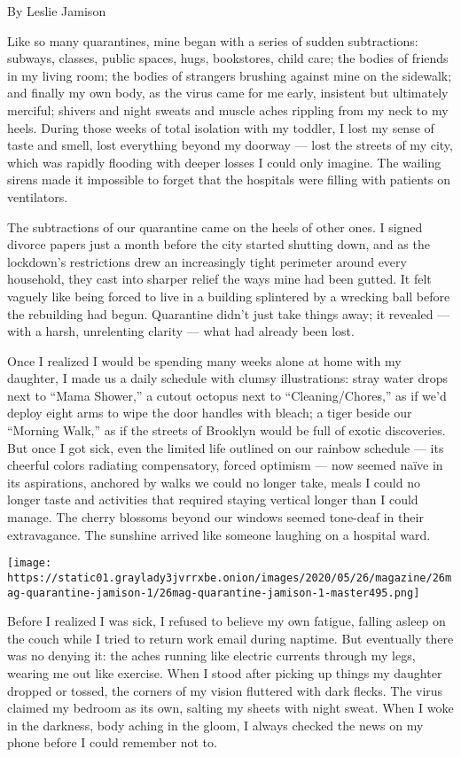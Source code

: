By Leslie Jamison

Like so many quarantines, mine began with a series of sudden
subtractions: subways, classes, public spaces, hugs, bookstores, child
care; the bodies of friends in my living room; the bodies of strangers
brushing against mine on the sidewalk; and finally my own body, as the
virus came for me early, insistent but ultimately merciful; shivers and
night sweats and muscle aches rippling from my neck to my heels. During
those weeks of total isolation with my toddler, I lost my sense of taste
and smell, lost everything beyond my doorway --- lost the streets of my
city, which was rapidly flooding with deeper losses I could only
imagine. The wailing sirens made it impossible to forget that the
hospitals were filling with patients on ventilators.

The subtractions of our quarantine came on the heels of other ones. I
signed divorce papers just a month before the city started shutting
down, and as the lockdown's restrictions drew an increasingly tight
perimeter around every household, they cast into sharper relief the ways
mine had been gutted. It felt vaguely like being forced to live in a
building splintered by a wrecking ball before the rebuilding had begun.
Quarantine didn't just take things away; it revealed --- with a harsh,
unrelenting clarity --- what had already been lost.

Once I realized I would be spending many weeks alone at home with my
daughter, I made us a daily schedule with clumsy illustrations: stray
water drops next to ``Mama Shower,'' a cutout octopus next to
``Cleaning/Chores,'' as if we'd deploy eight arms to wipe the door
handles with bleach; a tiger beside our ``Morning Walk,'' as if the
streets of Brooklyn would be full of exotic discoveries. But once I got
sick, even the limited life outlined on our rainbow schedule --- its
cheerful colors radiating compensatory, forced optimism --- now seemed
naïve in its aspirations, anchored by walks we could no longer take,
meals I could no longer taste and activities that required staying
vertical longer than I could manage. The cherry blossoms beyond our
windows seemed tone-deaf in their extravagance. The sunshine arrived
like someone laughing on a hospital ward.

\texttt{[image: https://static01.graylady3jvrrxbe.onion/images/2020/05/26/magazine/26mag-quarantine-jamison-1/26mag-quarantine-jamison-1-master495.png]}

Before I realized I was sick, I refused to believe my own fatigue,
falling asleep on the couch while I tried to return work email during
naptime. But eventually there was no denying it: the aches running like
electric currents through my legs, wearing me out like exercise. When I
stood after picking up things my daughter dropped or tossed, the corners
of my vision fluttered with dark flecks. The virus claimed my bedroom as
its own, salting my sheets with night sweat. When I woke in the
darkness, body aching in the gloom, I always checked the news on my
phone before I could remember not to.

